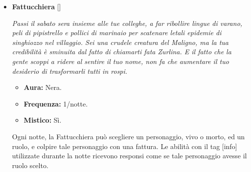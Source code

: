 \documentclass[a4paper,10pt]{article}
\begin{document}
\begin{itemize}
            \begin{multicols}{3}
                  \begin{itemize}
                        \item \textbf{Aura:} bianca.
                        \item \textbf{Frequenza:} n/a
                        \item \textbf{Mistico:} Sì.
                  \end{itemize}
            \end{multicols}

            Il Fantasma non ha alcuna abilità. All'inizio della partita, il Fantasma ottiene un elenco di poteri (eventualmente ripetuti).

            Ogni notte, se il Fantasma è morto, può selezionare un potere dal proprio elenco ed utilizzarlo, specificando il personaggio sul quale lo utilizza ed eventuali ulteriori informazioni. Se tale potere viene utilizzato con successo, viene rimosso dall'elenco.

      \item \textbf{Fattucchiera} []

            \emph{Passi il sabato sera insieme alle tue colleghe, a far ribollire lingue di varano, peli di pipistrello e pollici di marinaio per scatenare letali epidemie di singhiozzo nel villaggio. Sei una crudele creatura del Maligno, ma la tua credibilità è sminuita dal fatto di chiamarti fata Zurlina. E il fatto che la gente scoppi a ridere al sentire il tuo nome, non fa che aumentare il tuo desiderio di trasformarli tutti in rospi.}

            \begin{multicols}{3}
                  \begin{itemize}
                        \item \textbf{Aura:} Nera.
                        \item \textbf{Frequenza:} 1/notte.
                        \item \textbf{Mistico:} Sì.
                  \end{itemize}
            \end{multicols}

            Ogni notte, la Fattucchiera può scegliere un personaggio, vivo o morto, ed un ruolo, e colpire tale personaggio con una fattura. Le abilità con il tag [info] utilizzate durante la notte ricevono responsi come se tale personaggio avesse il ruolo scelto.


\end{itemize}
\end{document}
